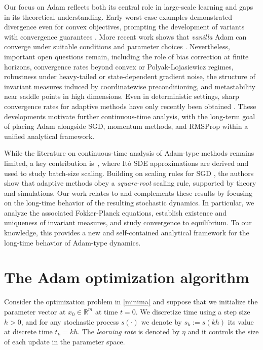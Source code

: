 \documentclass[11pt, a4paper,leqno]{amsart}
\theoremstyle{definition}
\numberwithin{equation}{section}
\begin{document}
Our focus on Adam reflects both its central role in large-scale learning and gaps in its theoretical understanding. Early worst-case examples demonstrated divergence even for convex objectives, prompting the development of variants with convergence guarantees \cite{Reddi2018,KingmaBa2015}. More recent work shows that \emph{vanilla} Adam can converge under suitable conditions and parameter choices \cite{Zhang2023}. Nevertheless, important open questions remain, including the role of bias correction at finite horizons, convergence rates beyond convex or Polyak-Lojasiewicz regimes, robustness under heavy-tailed or state-dependent gradient noise, the structure of invariant measures induced by coordinatewise preconditioning, and metastability near saddle points in high dimensions. Even in deterministic settings, sharp convergence rates for adaptive methods have only recently been obtained \cite{DereichJentzenRiekert2025}. These developments motivate further continuous-time analysis, with the long-term goal of placing Adam alongside SGD, momentum methods, and RMSProp within a unified analytical framework.



While the literature on continuous-time analysis of Adam-type methods remains limited, a key contribution is~\cite{malladi2022sdes}, where It\^o SDE approximations are derived and used to study batch-size scaling. Building on scaling rules for SGD \cite{goyal2017accurate,li2019stochastic,li2021validity}, the authors show that adaptive methods obey a \emph{square-root} scaling rule, supported by theory and simulations. Our work relates to and complements these results by focusing on the long-time behavior of the resulting stochastic dynamics. In particular, we analyze the associated Fokker-Planck equations, establish existence and uniqueness of invariant measures, and study convergence to equilibrium. To our knowledge, this provides a new and self-contained analytical framework for the long-time behavior of Adam-type dynamics.

\section{The {Adam} optimization algorithm} Consider the optimization problem in \eqref{minima} and suppose that we initialize the parameter vector at $x_0 \in \mathbb{R}^m$ at time $t=0$. We discretize time using a step size $h>0$, and for any stochastic process $s(\cdot)$ we denote by $s_k := s(kh)$ its value at discrete time $t_k = kh$. The \emph{learning rate} is denoted by $\eta$ and it controls the size of each update in the parameter space.
\end{document}
